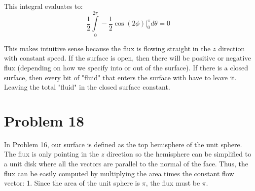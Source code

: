 \documentclass{article}
\begin{document}
This integral evaluates to:
$$ \frac{1}{2} \int\limits_0^{2\pi} -\frac{1}{2} \cos(2\phi) \bigg\vert_0^{\pi} d\theta
= 0 $$

This makes intuitive sense because the flux is flowing straight in the $z$
direction with constant speed. If the surface is open, then there will be
positive or negative flux (depending on how we specify into or out of the
surface). If there is a closed surface, then every bit of "fluid" that enters
the surface with have to leave it. Leaving the total "fluid" in the closed
surface constant. 

\section*{Problem 18}

In Problem 16, our surface is defined as the top hemisphere of the unit sphere.
The flux is only pointing in the $z$ direction so the hemisphere can be
simplified to a unit disk where all the vectors are parallel to the normal of
the face. Thus, the flux can be easily computed by multiplying the area times
the constant flow vector: 1. Since the area of the unit sphere is $\pi$, the
flux must be $\pi$.
\end{document}
